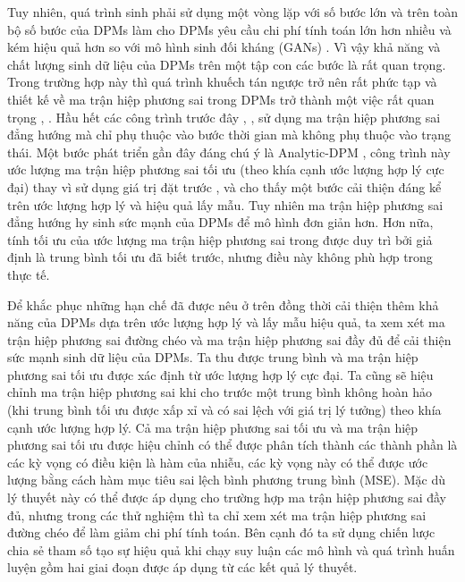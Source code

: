 \documentclass[14pt, a4paper]{article}
\numberwithin{equation}{section}
\numberwithin{figure}{section}
\numberwithin{dl}{section}
\numberwithin{md}{section}
\numberwithin{bd}{section}
\numberwithin{dn}{section}
\numberwithin{hq}{section}
\begin{document}
    Tuy nhiên, quá trình sinh phải sử dụng một vòng lặp với số bước lớn và trên toàn bộ số bước của DPMs làm cho DPMs yêu cầu chi phí tính toán lớn hơn nhiều và kém hiệu quả hơn so với mô hình sinh đối kháng (GANs) \cite{goodfellow2014generative}.
    Vì vậy khả năng và chất lượng sinh dữ liệu của DPMs trên một tập con các bước là rất quan trọng.
    Trong trường hợp này thì quá trình khuếch tán ngược trở nên rất phức tạp \cite{xiao2021tackling} và thiết kế về ma trận hiệp phương sai trong DPMs trở thành một việc rất quan trọng \cite{nichol2021improved}, \cite{bao2021analytic}.
    Hầu hết các công trình trước đây \cite{ho2020denoising}, \cite{song2020denoising}, \cite{bao2021analytic} sử dụng ma trận hiệp phương sai đẳng hướng mà chỉ phụ thuộc vào bước thời gian mà không phụ thuộc vào trạng thái.
    Một bước phát triển gần đây đáng chú ý là Analytic-DPM \cite{bao2021analytic},
    công trình này ước lượng ma trận hiệp phương sai tối ưu (theo khía cạnh ước lượng hợp lý cực đại) thay vì sử dụng giá trị đặt trước \cite{ho2020denoising}, \cite{song2020denoising} và cho thấy một bước cải thiện đáng kể trên ước lượng hợp lý và hiệu quả lấy mẫu.
    Tuy nhiên ma trận hiệp phương sai đẳng hướng hy sinh sức mạnh của DPMs để mô hình đơn giản hơn.
    Hơn nữa, tính tối ưu của ước lượng ma trận hiệp phương sai trong \cite{bao2021analytic} được duy trì bởi giả định là trung bình tối ưu đã biết trước,
    nhưng điều này không phù hợp trong thực tế.

    Để khắc phục những hạn chế đã được nêu ở trên đồng thời cải thiện thêm khả năng của DPMs dựa trên ước lượng hợp lý và lấy mẫu hiệu quả,
    ta xem xét ma trận hiệp phương sai đường chéo và ma trận hiệp phương sai đầy đủ để cải thiện sức mạnh sinh dữ liệu của DPMs.
    Ta thu được trung bình và ma trận hiệp phương sai tối ưu được xác định từ ước lượng hợp lý cực đại.
    Ta cũng sẽ hiệu chỉnh ma trận hiệp phương sai khi cho trước một trung bình không hoàn hảo (khi trung bình tối ưu được xấp xỉ và có sai lệch với giá trị lý tưởng) theo khía cạnh ước lượng hợp lý.
    Cả ma trận hiệp phương sai tối ưu và ma trận hiệp phương sai tối ưu được hiệu chỉnh có thể được phân tích thành các thành phần là các kỳ vọng có điều kiện là hàm của nhiễu,
    các kỳ vọng này có thể được ước lượng bằng cách hàm mục tiêu sai lệch bình phương trung bình (MSE).
    Mặc dù lý thuyết này có thể được áp dụng cho trường hợp ma trận hiệp phương sai đầy đủ, nhưng trong các thử nghiệm thì ta chỉ xem xét ma trận hiệp phương sai đường chéo để làm giảm chi phí tính toán.
    Bên cạnh đó ta sử dụng chiến lược chia sẻ tham số tạo sự hiệu quả khi chạy suy luận các mô hình và quá trình huấn luyện gồm hai giai đoạn được áp dụng từ các kết quả lý thuyết.
\end{document}
